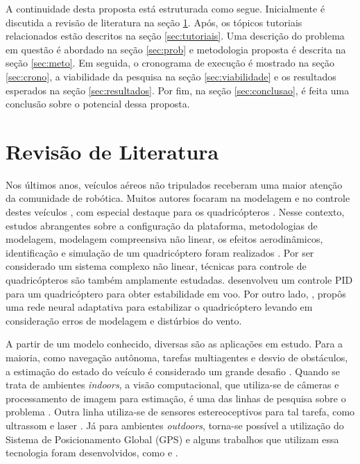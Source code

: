\documentclass[a4paper, 12pt]{article}
\begin{document}
A continuidade desta proposta está estruturada como segue. Inicialmente é discutida a revisão de literatura na seção \ref{sec:rev}. Após, os tópicos tutoriais relacionados estão descritos na seção \ref{sec:tutoriais}. Uma descrição do problema em questão é abordado na seção \ref{sec:prob} e metodologia proposta é descrita na seção \ref{sec:meto}. Em seguida, o cronograma de execução é mostrado na seção \ref{sec:crono}, a viabilidade da pesquisa na seção \ref{sec:viabilidade} e os resultados esperados na seção \ref{sec:resultados}. Por fim, na seção \ref{sec:conclusao}, é feita uma conclusão sobre o potencial dessa proposta. 

\newpage

\section{Revisão de Literatura}
\label{sec:rev}

Nos últimos anos, veículos aéreos não tripulados receberam uma maior atenção da comunidade de robótica. Muitos autores focaram na modelagem e no controle destes veículos \cite{Ye2006},  com especial destaque para os quadricópteros \cite{Altug2002}. Nesse contexto, estudos abrangentes sobre a configuração da plataforma, metodologias de modelagem, modelagem compreensiva não linear, os efeitos aerodinâmicos, identificação e simulação de um quadricóptero foram realizados \cite{Zhang2014} \cite{Gibiansky2010}. Por ser considerado um sistema complexo não linear, técnicas para controle de quadricópteros são também amplamente estudadas. \cite{Salih2010} desenvolveu um controle PID para um quadricóptero para obter estabilidade em voo. Por outro lado, \cite{Nicol2008}, propôs uma rede neural adaptativa para estabilizar o quadricóptero levando em consideração erros de modelagem e distúrbios do vento.

A partir de um modelo conhecido, diversas são as aplicações em estudo. Para a maioria, como navegação autônoma, tarefas multiagentes e desvio de obstáculos, a estimação do estado do veículo é considerado um grande desafio \cite{Achtelik2009}. Quando se trata de ambientes \textit{indoors}, a visão computacional, que utiliza-se de câmeras e processamento de imagem para estimação, é uma das linhas de pesquisa sobre o problema \cite{Shen2013} \cite{Blosch2010} \cite{Shen2013a}. Outra linha utiliza-se de sensores estereoceptivos para tal tarefa, como ultrassom \cite{Roberts2007} e laser \cite{Grzonka2012}. Já para ambientes \textit{outdoors}, torna-se possível a utilização do Sistema de Posicionamento Global (GPS) e alguns trabalhos que utilizam essa tecnologia foram desenvolvidos, como  \cite{Hoffmann2004} e \cite{Wendel2006}.
\end{document}

